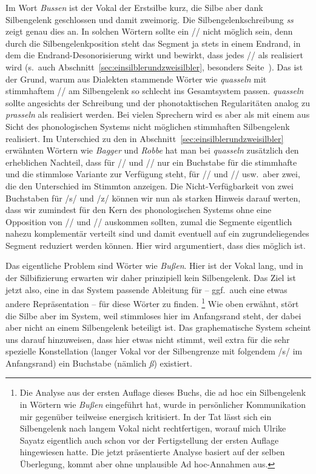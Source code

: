 Im Wort \textit{Bussen} \textipa{[bU\Sgel{s}@n]} ist der Vokal der Erstsilbe kurz, die Silbe aber dank Silbengelenk geschlossen und damit zweimorig.
Die Silbengelenkschreibung \textit{ss} zeigt genau dies an.
In solchen Wörtern sollte ein // nicht möglich sein, denn durch die Silbengelenkposition steht das Segment ja stets in einem Endrand, in dem die Endrand-Desonorisierung wirkt und bewirkt, dass jedes // als \textipa{[s]} realisiert wird (s.\ auch Abschnitt~\ref{sec:einsilblerundzweisilbler}, besonders Seite~\pageref{abs:einsilblerundzweisilbler149}).
Das ist der Grund, warum aus Dialekten stammende Wörter wie \textit{quasseln} mit stimmhaftem // am Silbengelenk so schlecht ins Gesamtsystem passen.
\textit{quasseln} sollte angesichts der Schreibung und der phonotaktischen Regularitäten analog zu \textit{prasseln}  als  realisiert werden.
Bei vielen Sprechern wird es aber als  mit einem aus Sicht des phonologischen Systems nicht möglichen stimmhaften Silbengelenk realisiert.
Im Unterschied zu den in Abschnitt~\ref{sec:einsilblerundzweisilbler} erwähnten Wörtern wie \textit{Bagger} und \textit{Robbe} hat man bei \textit{quasseln} zusätzlich den erheblichen Nachteil, dass für // und // nur ein Buchstabe für die stimmhafte und die stimmlose Variante zur Verfügung steht, für // und // usw.\ aber zwei, die den Unterschied im Stimmton anzeigen.
Die Nicht-Verfügbarkeit von zwei Buchstaben für /s/ und /z/ können wir nun als starken Hinweis darauf werten, dass wir zumindest für den Kern des phonologischen Systems ohne eine Opposition von // und // auskommen sollten, zumal die Segmente eigentlich nahezu komplementär verteilt sind und damit eventuell auf ein zugrundeliegendes Segment reduziert werden können.
Hier wird argumentiert, dass dies möglich ist.

Das eigentliche Problem sind Wörter wie \textit{Bußen}.
Hier ist der Vokal lang, und in der Silbifizierung \textipa{[bu:.s@n]} erwarten wir daher prinzipiell kein Silbengelenk.
Das Ziel ist jetzt also, eine in das System passende Ableitung für \textipa{[bu:.s@n]} -- ggf.\ auch eine etwas andere Repräsentation -- für diese Wörter zu finden.%
\footnote{Die Analyse aus der ersten Auflage dieses Buchs, die ad hoc ein Silbengelenk in Wörtern wie \textit{Bußen} eingeführt hat, wurde in persönlicher Kommunikation mir gegenüber teilweise energisch kritisiert.
In der Tat lässt sich ein Silbengelenk nach langem Vokal nicht rechtfertigen, worauf mich Ulrike Sayatz eigentlich auch schon vor der Fertigstellung der ersten Auflage hingewiesen hatte.
Die jetzt präsentierte Analyse basiert auf der selben Überlegung, kommt aber ohne unplausible Ad hoc-Annahmen aus.}
Wie oben erwähnt, stört die Silbe \textipa{[s@n]} aber im System, weil stimmloses \textipa{[s]} hier im Anfangsrand steht, der dabei aber nicht an einem Silbengelenk beteiligt ist.
Das graphematische System scheint uns darauf hinzuweisen, dass hier etwas nicht stimmt, weil extra für die sehr spezielle Konstellation (langer Vokal vor der Silbengrenze mit folgendem /s/ im Anfangsrand) ein Buchstabe (nämlich \textit{ß}) existiert.


